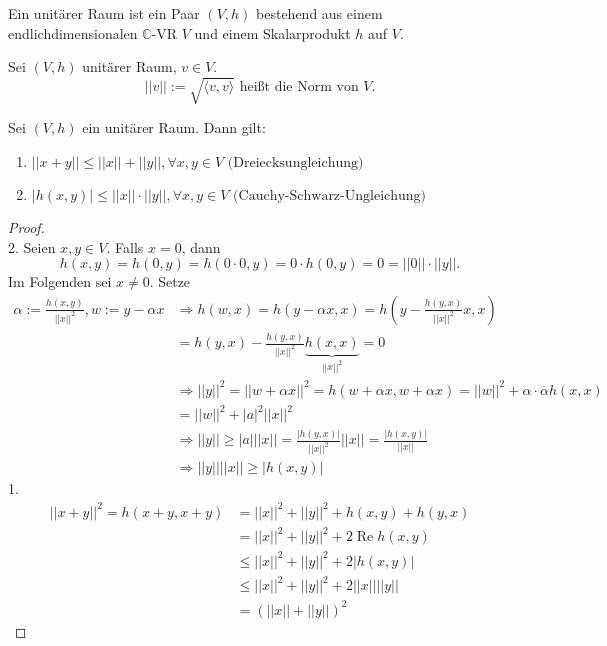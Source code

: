 \documentclass[a4paper, titlepage]{article}
\theoremstyle{definition}
\newcommand{\C}{\mathbb{C}}
\begin{document}
\begin{definition}
	Ein unitärer Raum ist ein Paar $(V,h)$ bestehend aus einem endlichdimensionalen $\C$-VR $V$ und einem Skalarprodukt $h$ auf $V$.
\end{definition}
\begin{definition}
	Sei $(V,h)$ unitärer Raum, $v\in V.$
	$$||v|| := \sqrt{\langle v,v \rangle} \text{ heißt die Norm von } V.$$
\end{definition}
\begin{satz}
	Sei $(V,h)$ ein unitärer Raum. Dann gilt:
	\begin{enumerate}
		\item $||x+y|| \leq ||x||+||y||, \forall x,y \in V \text{ (Dreiecksungleichung)}$
		\item $|h(x,y)| \leq ||x|| \cdot ||y||, \forall x,y \in V \text{ (Cauchy-Schwarz-Ungleichung) }$
	\end{enumerate}
\end{satz}
\begin{proof}\ \\
		2. Seien $x,y \in V$. Falls $x =0$, dann $$h(x,y) = h(0,y) = h(0\cdot 0, y) = 0\cdot h(0,y) = 0 = || 0|| \cdot ||y||.$$
		Im Folgenden sei $x \neq 0$.
		 Setze 
		 \begin{align*}
			\alpha := \frac{h(x,y)}{||x||^2}, w := y-\alpha x 
			&\Rightarrow h(w,x) = h(y-\alpha x , x) = h(y- \frac{h(y,x)}{||x||^2}x,x) \\ 
			&= h(y,x)-\frac{h(y,x)}{||x||^2}\underbrace{h(x,x)}_{||x||^2}=0\\
			&\Rightarrow ||y||^2 = ||w +\alpha x||^2 = h(w+\alpha x, w + \alpha x) = ||w||^2 + \alpha \cdot \overline{\alpha}h(x,x)\\ 
			& = ||w||^2 + |a|^2||x||^2\\
			& \Rightarrow ||y|| \geq |a|||x|| = \frac{|h(y,x)|}{||x||^2}||x|| = \frac{|h(x,y)|}{||x||}\\
			&\Rightarrow ||y||||x|| \geq |h(x,y)|
		\end{align*}
		1. \begin{align*}
		||x+y||^2 = h(x+y,x+y) &= ||x||^2+||y||^2+h(x,y)+h(y,x)\\
		&=||x||^2+||y||^2+2\operatorname{Re}h(x,y)\\
		&\leq ||x||^2+||y||^2+2|h(x,y)|\\
		&\leq ||x||^2+||y||^2+2||x||||y||\\
		&= (||x||+||y||)^2
	\end{align*}
\end{proof}
\newpage
\end{document}
